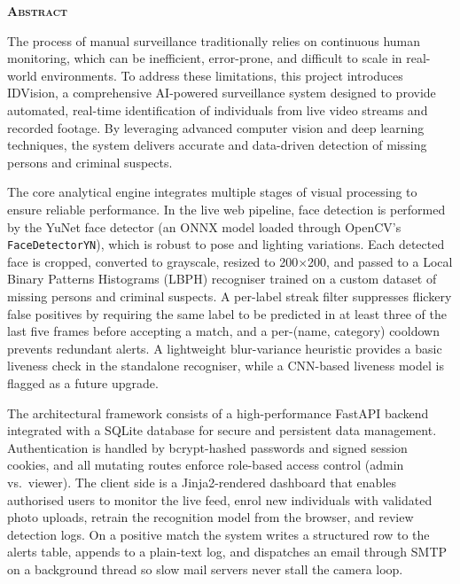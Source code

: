 \documentclass[11pt]{report}
\begin{document}
\begin{titlepage}
\begin{center}
\textsc{\textbf{\LARGE Abstract}}\\[2cm]
\end{center}
The process of manual surveillance traditionally relies on continuous human monitoring, which can be inefficient, error-prone, and difficult to scale in real-world environments. To address these limitations, this project introduces IDVision, a comprehensive AI-powered surveillance system designed to provide automated, real-time identification of individuals from live video streams and recorded footage. By leveraging advanced computer vision and deep learning techniques, the system delivers accurate and data-driven detection of missing persons and criminal suspects.


The core analytical engine integrates multiple stages of visual processing to ensure reliable performance. In the live web pipeline, face detection is performed by the YuNet face detector (an ONNX model loaded through OpenCV's \texttt{FaceDetectorYN}), which is robust to pose and lighting variations. Each detected face is cropped, converted to grayscale, resized to 200$\times$200, and passed to a Local Binary Patterns Histograms (LBPH) recogniser trained on a custom dataset of missing persons and criminal suspects. A per-label streak filter suppresses flickery false positives by requiring the same label to be predicted in at least three of the last five frames before accepting a match, and a per-(name, category) cooldown prevents redundant alerts. A lightweight blur-variance heuristic provides a basic liveness check in the standalone recogniser, while a CNN-based liveness model is flagged as a future upgrade.


The architectural framework consists of a high-performance FastAPI backend integrated with a SQLite database for secure and persistent data management. Authentication is handled by bcrypt-hashed passwords and signed session cookies, and all mutating routes enforce role-based access control (admin vs.\ viewer). The client side is a Jinja2-rendered dashboard that enables authorised users to monitor the live feed, enrol new individuals with validated photo uploads, retrain the recognition model from the browser, and review detection logs. On a positive match the system writes a structured row to the alerts table, appends to a plain-text log, and dispatches an email through SMTP on a background thread so slow mail servers never stall the camera loop.



\end{titlepage}
\end{document}
